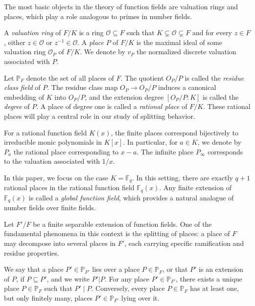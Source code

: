 \documentclass[1p,final]{elsarticle}
\newtheorem{open problem}[theorem]{Open Problem}
\begin{document}
\medskip

The most basic objects in the theory of function fields are valuation rings and places, which play a role analogous to primes in number fields.

A \emph{valuation ring} of \( F/K \) is a ring \( \mathcal{O} \subseteq F \) such that \( K \subsetneq \mathcal{O} \subsetneq F \) and for every \( z \in F \), either \( z \in \mathcal{O} \) or \( z^{-1} \in \mathcal{O} \). A \emph{place} \( P \) of \( F/K \) is the maximal ideal of some valuation ring \( \mathcal{O}_P \) of \( F/K \). We denote by $v_{P}$ the normalized discrete valuation associated with $P$.

Let $\mathbb{P}_F $ denote the set of all places of $F$. The quotient $O_{P}/P$ is called the \emph{residue class field} of $P$. The residue class map $O_{P}\to O_{P}/P$ induces a canonical embedding of $K$ into $O_{P}/P$, and the extension degree $[O_{P}/P:K]$ is called the \emph{degree} of $P$. A place of degree one is called a \emph{rational place} of $F/K$. These rational places will play a central role in our study of splitting behavior.

\medskip

For a rational function field \( K(x) \), the finite places correspond bijectively to irreducible monic polynomials in $K[x]$. In particular, for $a\in K$, we denote by $P_{a}$ the rational place corresponding to $x-a$. The infinite place \( P_\infty \) corresponds to the valuation associated with $1/x$.

In this paper, we focus on the case $K=\mathbb{F}_{q}$. In this setting, there are exactly $q+1$ rational places in the rational function field $\mathbb{F}_{q}(x)$. Any finite extension of $\mathbb{F}_{q}(x)$ is called a \emph{global function field}, which provides a natural analogue of number fields over finite fields.

\medskip

Let $F'/F$ be a finite separable extension of function fields. One of the fundamental phenomena in this context is the splitting of places: a place of \( F \) may decompose into several places in \( F' \), each carrying specific ramification and residue properties.

We say that a place \( P' \in \mathbb{P}_{F'} \) lies over a place \( P \in \mathbb{P}_F \), or that $P'$ is an extension of $P$, if \( P \subseteq P' \), and we write $P'|P$. For any place \( P' \in \mathbb{P}_{F'} \), there exists a unique place \( P \in \mathbb{P}_F \) such that \( P' \mid P \). Conversely, every place \( P \in \mathbb{P}_F \) has at least one, but only finitely many, places \( P' \in \mathbb{P}_{F'} \) lying over it.
\end{document}
